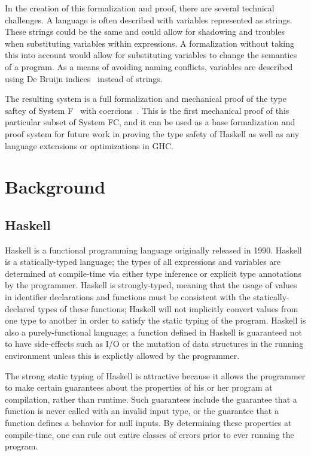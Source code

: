 \documentclass{sig-alternate}
\begin{document}
In the creation of this formalization and proof, there are several technical challenges. A language is often described with variables represented as strings. These strings could be the same and could allow for shadowing and troubles when substituting variables within expressions. A formalization without taking this into account would allow for substituting variables to change the semantics of a program. As a means of avoiding naming conflicts, variables are described using De Bruijn indices~\cite{Vouillon12} instead of strings.

The resulting system is a full formalization and mechanical proof of the type saftey of System F~\cite{Pierce:TAPL} with coercions~\cite{DBLP:conf/rta/VytiniotisJ13}. This is the first mechanical proof of this particular subset of System FC, and it can be used as a base formalization and proof system for future work in proving the type safety of Haskell as well as any language extensions or optimizations in GHC.

\section{Background}
\label{sec:background}

\subsection{Haskell}
\label{sec:background-haskell}

Haskell is a functional programming language originally released in 1990. Haskell is a statically-typed language; the types of all expressions and variables are determined at compile-time via either type inference or explicit type annotations by the programmer. Haskell is strongly-typed, meaning that the usage of values in identifier declarations and functions must be consistent with the statically-declared types of these functions; Haskell will not implicitly convert values from one type to another in order to satisfy the static typing of the program. Haskell is also a purely-functional language; a function defined in Haskell is guaranteed not to have side-effects such as I/O or the mutation of data structures in the running environment unless this is explictly allowed by the programmer. 

The strong static typing of Haskell is attractive because it allows the programmer to make certain guarantees about the properties of his or her program at compilation, rather than runtime. Such guarantees include the guarantee that a function is never called with an invalid input type, or the guarantee that a function defines a behavior for null inputs. By determining these properties at compile-time, one can rule out entire classes of errors prior to ever running the program.
\end{document}
